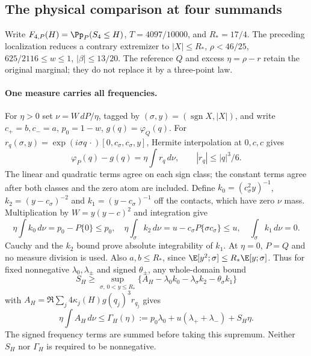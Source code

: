 \subsection{The physical comparison at four summands}\label{j:finite:n4physical}
Write $F_{4,P}(H)=\Pp_P(S_4\le H)$, $T=4097/10000$, and
$R_*=17/4$. The preceding localization reduces a contrary extremizer
to $|X|\le R_*$, $\rho<46/25$, $625/2116\le w\le1$,
$|\beta|\le13/20$. The reference $Q$ and excess $\eta=\rho-r$
retain the original marginal; they do not replace it by a three-point law.

\paragraph{One measure carries all frequencies.}
For $\eta>0$ set $\nu=W\,dP/\eta$, tagged by
$(\sigma,y)=(\operatorname{sgn}X,|X|)$, and write $c_+=b,c_-=a$,
$p_0=1-w$, $g(q)=\varphi_Q(q)$. For
$r_q(\sigma,y)=\exp(i\sigma q\,\cdot)[0,c_\sigma,c_\sigma,y]$,
Hermite interpolation at $0,c,c$ gives
\begin{equation}\label{j:finite:n4measure}
 \varphi_P(q)-g(q)=\eta\int r_q\,d\nu,\qquad |r_q|\le |q|^3/6.
\end{equation}
The linear and quadratic terms agree on each sign class; the constant
terms agree after both classes and the zero atom are included.
Define $k_0=(c_\sigma^2y)^{-1}$, $k_2=(y-c_\sigma)^{-2}$ and
$k_1=(y-c_\sigma)^{-1}$ off the contacts, which have zero $\nu$ mass.
Multiplication by $W=y(y-c)^2$ and integration give
\[
 \eta\int k_0\,d\nu=p_0-P\{0\}\le p_0,\quad
 \eta\int_\sigma k_2\,d\nu=u-c_\sigma P\{\sigma c_\sigma\}\le u,\quad
 \int_\sigma k_1\,d\nu=0.
\]
Cauchy and the $k_2$ bound prove absolute integrability of $k_1$.
At $\eta=0$, $P=Q$ and no measure division is used. Also $a,b\le R_*$,
since $\E[y^2;\sigma]\le R_*\E[y;\sigma]$.
Thus for fixed nonnegative $\lambda_0,\lambda_\pm$ and signed
$\theta_\pm$, any whole-domain bound
\[
 S_H\ge\sup_{\sigma,\,0<y\le R_*}
 \{A_H-\lambda_0k_0-\lambda_\sigma k_2-\theta_\sigma k_1\}
\]
with $A_H=\Re\sum_j4\kappa_j(H)g(q_j)^3r_{q_j}$ gives
\begin{equation}\label{j:finite:n4priced}
 \eta\int A_H\,d\nu\le
 \Gamma_H(\eta):=p_0\lambda_0+u(\lambda_++\lambda_-)+S_H\eta.
\end{equation}
The signed frequency terms are summed before taking this supremum.
Neither $S_H$ nor $\Gamma_H$ is required to be nonnegative.

